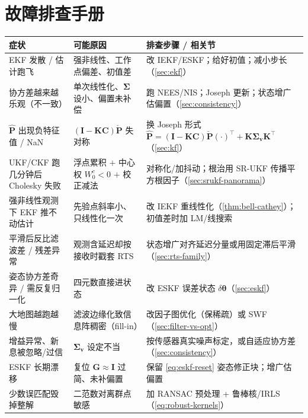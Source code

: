 \section*{故障排查手册}
\begin{table}[H]\centering\small
\begin{tabular}{p{}p{}p{}}
\toprule
症状 & 可能原因 & 排查步骤 / 相关节 \\
\midrule
EKF 发散 / 估计跑飞 & 强非线性、工作点偏差、初值差 & 改 IEKF/ESKF；给好初值；减小步长（\cref{sec:ekf}） \\
协方差越来越乐观（不一致） & 单次线性化、$\boldsymbol{\Sigma}$ 设小、偏置未补偿 & 跑 NEES/NIS；Joseph 更新；状态增广估偏置（\cref{sec:consistency}） \\
$\hat{\mathbf{P}}$ 出现负特征值 / NaN & $(\mathbf{I}-\mathbf{K}\mathbf{C})\check{\mathbf{P}}$ 失对称 & 换 Joseph 形式 $\hat{\mathbf{P}}=(\mathbf{I}-\mathbf{K}\mathbf{C})\check{\mathbf{P}}(\cdot)^\top+\mathbf{K}\boldsymbol{\Sigma}_{\mathbf{v}}\mathbf{K}^\top$（\cref{sec:kf}） \\
UKF/CKF 跑几分钟后 Cholesky 失败 & 浮点累积 $+$ 中心权 $W_0^c<0$ $+$ 校正减法 & 对称化/加抖动；根治用 SR-UKF 传播平方根因子（\cref{sec:srukf-panorama}） \\
强非线性观测下 EKF 推不动估计 & 先验点斜率小、只线性化一次 & 改 IEKF 重线性化（\cref{thm:bell-cathey}）；初值差时加 LM/线搜索 \\
平滑后反比滤波差 / 残差异常 & 观测含延迟却按接收时戳套 RTS & 状态增广对齐延迟分量或用固定滞后平滑（\cref{sec:rts-family}） \\
姿态协方差奇异 / 需反复归一化 & 四元数直接进状态 & 改 ESKF 误差状态 $\delta\boldsymbol{\theta}$（\cref{sec:eskf}） \\
大地图越跑越慢 & 滤波边缘化致信息阵稠密（fill-in） & 改因子图优化（保稀疏）或 SWF（\cref{sec:filter-vs-opt}） \\
增益异常、新息被忽略/过信 & $\boldsymbol{\Sigma}_{\mathbf{v}}$ 设定不当 & 按传感器真实噪声标定，或自适应协方差（\cref{sec:consistency}） \\
ESKF 长期漂移 & 复位 $\mathbf{G}\approx\mathbf{I}$ 过简、未补偏置 & 保留 \cref{eq:eskf-reset} 姿态修正块；增广估偏置 \\
少数误匹配毁掉整解 & 二范数对离群点敏感 & 加 RANSAC 预处理 + 鲁棒核/IRLS（\cref{eq:robust-kernels}） \\
\bottomrule
\end{tabular}
\end{table}

